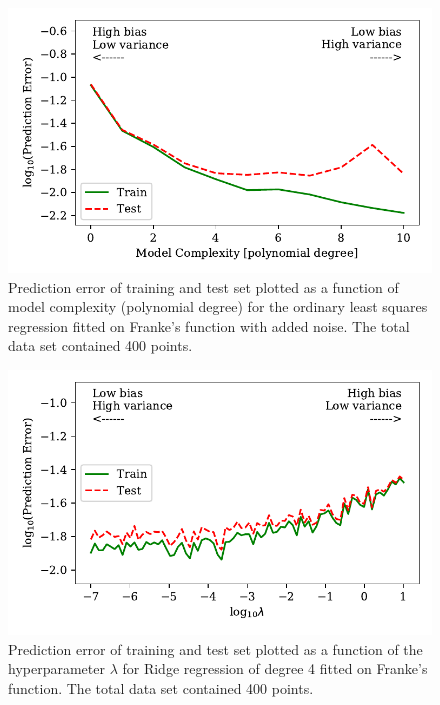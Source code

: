 \documentclass[a4paper, 10pt]{article}
\begin{document}
\begin{figure}[H]
    \includegraphics[scale=1]{figs/biasvariancetradeoff_ols_Franke.pdf}
    \caption{Prediction error of training and test set plotted as a function of model complexity (polynomial degree) for the ordinary least squares regression fitted on Franke's function with added noise. The total data set contained 400 points.}
    \label{fig:bias_ols_Franke}
\end{figure}

\begin{figure}[H]
    \includegraphics{figs/biasvariancetradeoff_Ridge_Franke.pdf}
    \caption{Prediction error of training and test set plotted as a function of the hyperparameter $\lambda$ for Ridge regression of degree 4 fitted on Franke's function. The total data set contained 400 points.}
    \label{fig:bias_ridge_Franke}
\end{figure}
\end{document}
